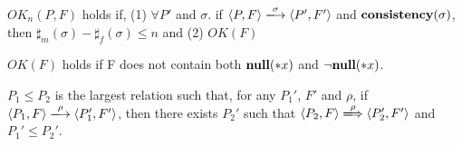 \begin{myDef}
\label{df:okn}
\(OK_{n}(P, F)\) holds if, (1) \( \forall P'\) and \(\sigma\). if \( \langle P, F \rangle
\xlongrightarrow{\sigma} \langle P', F' \rangle \) and \(\mathbf{consistency}(\sigma)\), then \( \sharp_m(\sigma) - \sharp_f(\sigma) \le n\) and (2) \( OK(F) \)
\end{myDef}

\begin{myDef}
\label{df:okf}
\(OK(F)\) holds if F does not contain both \( {\bf null}(*x) \) and \( \neg{\bf null}(*x) \).
\end{myDef}


\begin{myDef}[Subtyping]
\(P_1 \le P_2\) is the largest relation such that, for any \(P_1'\), \(F'\)
and \(\rho\), if \( \langle P_1, F \rangle \xlongrightarrow{\rho} \langle P_1', F' \rangle \), then there
exists \(P_2'\) such that \( \langle P_2, F \rangle \xLongrightarrow{\rho} \langle P_2', F' \rangle \) and
\(P_1' \le P_2'\).
\label{df:subtype}
\end{myDef}


